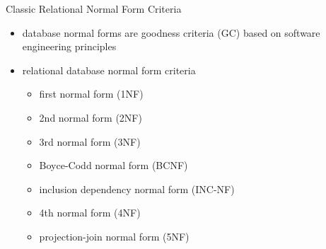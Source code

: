 \begin{frame}{Classic Relational Normal Form Criteria}
\begin{itemize}
    \item database normal forms are goodness criteria (GC) based on software engineering principles
    \item relational database normal form criteria  
    \begin{itemize}
        \item first normal form (1NF)
        \item 2nd normal form (2NF)
        \item 3rd normal form (3NF)
        \item Boyce-Codd normal form (BCNF)
        \item inclusion dependency normal form (INC-NF)
        \item 4th normal form (4NF)
        \item projection-join normal form (5NF)
    \end{itemize}
\end{itemize}
\end{frame}


\iffalse
\begin{frame}{Methods of Data Specification}
\begin{itemize}
	\item schema of relational database,
	\item structure described by Carnegie-Mellon IDL,
	\item schema of nested relational database,
	\item message structure described by Google protocol buffer IDL,
	\item XML schema language,
	\item ER script.
\end{itemize}
\end{frame}
\fi

